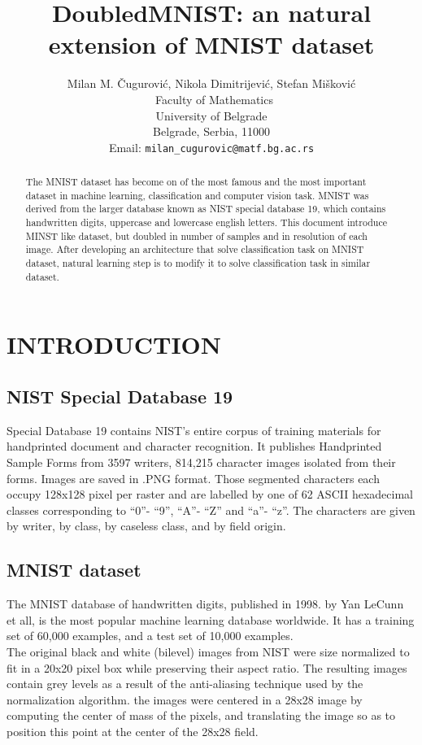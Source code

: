 \documentclass[letterpaper, 10 pt, conference]{ieeeconf}
\title{\LARGE \bf
DoubledMNIST: an natural extension of MNIST dataset
}
\author{Milan M. Čugurović, Nikola Dimitrijević, Stefan Mišković \\\
 	Faculty of Mathematics \\
	University of Belgrade \\
	Belgrade, Serbia, 11000 \\
	Email: {\tt\small milan\_cugurovic@matf.bg.ac.rs}
}
\begin{document}
\maketitle
\thispagestyle{empty}
\pagestyle{empty}

\begin{abstract}

The MNIST dataset has become on of the most famous and the most important dataset in machine learning, classification and computer vision task. MNIST was derived from the larger database known as NIST special database 19, which contains handwritten digits, uppercase and lowercase english letters. This document introduce MINST like dataset, but doubled in number of samples and in resolution of each image. After developing an architecture that solve classification task on MNIST dataset, natural learning step is to modify it to solve classification task in similar dataset.

\end{abstract}

\section{INTRODUCTION}

\subsection{NIST Special Database 19}
Special Database 19 contains NIST's entire corpus of training materials for handprinted document and character recognition. It publishes Handprinted Sample Forms from 3597 writers, 814,215 character images isolated from their forms. Images are saved in .PNG format. Those segmented characters each occupy 128x128 pixel per raster and are labelled by one of 62 ASCII hexadecimal classes corresponding to “0”- “9”, “A”- “Z” and “a”- “z”. The characters are given by writer, by class, by caseless class, and by field origin.

\subsection{MNIST dataset}
The MNIST database of handwritten digits, published in 1998. by Yan LeCunn et all, is the most popular machine learning database worldwide. It has a training set of 60,000 examples, and a test set of 10,000 examples. \\
The original black and white (bilevel) images from NIST were size normalized to fit in a 20x20 pixel box while preserving their aspect ratio. The resulting images contain grey levels as a result of the anti-aliasing technique used by the normalization algorithm. the images were centered in a 28x28 image by computing the center of mass of the pixels, and translating the image so as to position this point at the center of the 28x28 field.
\end{document}
